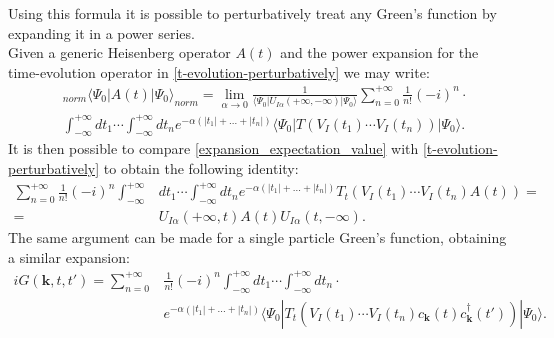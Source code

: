 \documentclass[12pt, a4paper]{report}
\numberwithin{equation}{section}
\begin{document}
Using this formula it is possible to perturbatively treat any Green's function by expanding it in a power series.\\
Given a generic Heisenberg operator $A(t)$ and the power expansion for the time-evolution operator in \ref{t-evolution-perturbatively} we may write:
\begin{equation}
\begin{split}
    &_{norm}\langle \Psi_0|A(t)|\Psi_0\rangle_{norm}=\lim_{\alpha\to 0}\frac{1}{\langle \Psi_0|U_{I\alpha}(+\infty,-\infty)|\Psi_0\rangle}\sum_{n=0}^{+\infty}\frac{1}{n!}\left(-i\right)^n\cdot \\
    &\int_{-\infty}^{+\infty}dt_1\cdots\int_{-\infty}^{+\infty}dt_n e^{-\alpha(|t_1|+...+|t_n|)}\langle\Psi_0|T\left(V_I(t_1)\cdots V_I(t_n)\right)|\Psi_0\rangle.
\end{split}
\label{expansion_expectation_value}
\end{equation}
It is then possible to compare \ref{expansion_expectation_value} with \ref{t-evolution-perturbatively} to obtain the following identity:
\begin{equation}
\begin{split}
    \sum_{n=0}^{+\infty}\frac{1}{n!}(-i)^n\int_{-\infty}^{+\infty}&dt_1\cdots\int_{-\infty}^{+\infty}dt_ne^{-\alpha(|t_1|+...+|t_n|)}T_t\left(V_I(t_1)\cdots V_I(t_n)A(t)\right)=\\
    =&U_{I\alpha}(+\infty,t)A(t)U_{I\alpha}(t,-\infty).
\end{split}
\end{equation}
The same argument can be made for a single particle Green's function, obtaining a similar expansion:
\begin{equation}
\begin{split}
    iG(\mathbf{k},t,t')=\sum_{n=0}^{+\infty}&\frac{1}{n!}(-i)^n\int_{-\infty}^{+\infty}dt_1\cdots\int_{-\infty}^{+\infty}dt_n\cdot \\
    &e^{-\alpha(|t_1|+...+|t_n|)}\langle\Psi_0|T_t\left(V_I(t_1)\cdots V_I(t_n)c_\mathbf{k}(t)c^\dagger_{\mathbf{k}}(t')\right)|\Psi_0\rangle.
\end{split}
\end{equation}
\end{document}
